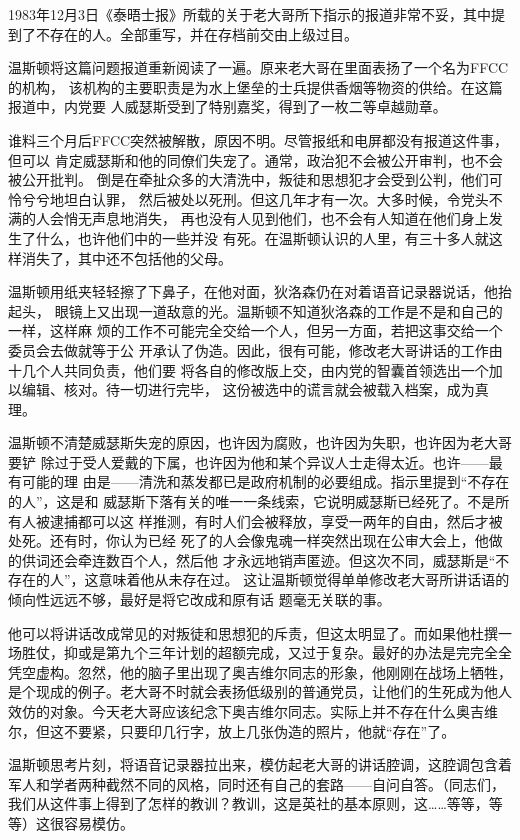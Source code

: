 1983年12月3日《泰晤士报》所载的关于老大哥所下指示的报道非常不妥，其中提到了不存在的人。全部重写，并在存档前交由上级过目。

温斯顿将这篇问题报道重新阅读了一遍。原来老大哥在里面表扬了一个名为FFCC的机构，
该机构的主要职责是为水上堡垒的士兵提供香烟等物资的供给。在这篇报道中，内党要
人威瑟斯受到了特别嘉奖，得到了一枚二等卓越勋章。

谁料三个月后FFCC突然被解散，原因不明。尽管报纸和电屏都没有报道这件事，但可以
肯定威瑟斯和他的同僚们失宠了。通常，政治犯不会被公开审判，也不会被公开批判。
倒是在牵扯众多的大清洗中，叛徒和思想犯才会受到公判，他们可怜兮兮地坦白认罪，
然后被处以死刑。但这几年才有一次。大多时候，令党头不满的人会悄无声息地消失，
再也没有人见到他们，也不会有人知道在他们身上发生了什么，也许他们中的一些并没
有死。在温斯顿认识的人里，有三十多人就这样消失了，其中还不包括他的父母。

温斯顿用纸夹轻轻擦了下鼻子，在他对面，狄洛森仍在对着语音记录器说话，他抬起头，
眼镜上又出现一道敌意的光。温斯顿不知道狄洛森的工作是不是和自己的一样，这样麻
烦的工作不可能完全交给一个人，但另一方面，若把这事交给一个委员会去做就等于公
开承认了伪造。因此，很有可能，修改老大哥讲话的工作由十几个人共同负责，他们要
将各自的修改版上交，由内党的智囊首领选出一个加以编辑、核对。待一切进行完毕，
这份被选中的谎言就会被载入档案，成为真理。

温斯顿不清楚威瑟斯失宠的原因，也许因为腐败，也许因为失职，也许因为老大哥要铲
除过于受人爱戴的下属，也许因为他和某个异议人士走得太近。也许——最有可能的理
由是——清洗和蒸发都已是政府机制的必要组成。指示里提到``不存在的人''，这是和
威瑟斯下落有关的唯一一条线索，它说明威瑟斯已经死了。不是所有人被逮捕都可以这
样推测，有时人们会被释放，享受一两年的自由，然后才被处死。还有时，你认为已经
死了的人会像鬼魂一样突然出现在公审大会上，他做的供词还会牵连数百个人，然后他
才永远地销声匿迹。但这次不同，威瑟斯是``不存在的人''，这意味着他从未存在过。
这让温斯顿觉得单单修改老大哥所讲话语的倾向性远远不够，最好是将它改成和原有话
题毫无关联的事。

他可以将讲话改成常见的对叛徒和思想犯的斥责，但这太明显了。而如果他杜撰一场胜仗，抑或是第九个三年计划的超额完成，又过于复杂。最好的办法是完完全全凭空虚构。忽然，他的脑子里出现了奥吉维尔同志的形象，他刚刚在战场上牺牲，是个现成的例子。老大哥不时就会表扬低级别的普通党员，让他们的生死成为他人效仿的对象。今天老大哥应该纪念下奥吉维尔同志。实际上并不存在什么奥吉维尔，但这不要紧，只要印几行字，放上几张伪造的照片，他就``存在''了。

温斯顿思考片刻，将语音记录器拉出来，模仿起老大哥的讲话腔调，这腔调包含着军人和学者两种截然不同的风格，同时还有自己的套路——自问自答。（同志们，我们从这件事上得到了怎样的教训？教训，这是英社的基本原则，这\ldots\ldots 等等，等等）这很容易模仿。

